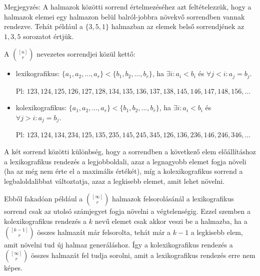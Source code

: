 


Megjegyzés: A halmazok közötti sorrend értelmezéséhez azt feltételezzük, hogy a halmazok elemei egy halmazon belül balról-jobbra növekvő sorrendben vannak rendezve. Tehát például a $\{3, 5, 1\}$ halmazban az elemek belső sorrendjének az $1, 3, 5$ sorozatot értjük.

\vspace{1em}

\noindent A $\binom{[n]}{r}$ nevezetes sorrendjei közül kettő:
\begin{itemize}
  \item lexikografikus:\hphantom{ko} $\{a_1, a_2, ..., a_r\} < \{b_1, b_2, ..., b_r\}$, ha $\exists i: a_i < b_i$ és $\forall j < i: a_j = b_j$.

  Pl: $123, 124, 125, 126, 127, 128, 134, 135, 136, 137, 138, 145, 146, 147, 148, 156, \dots$

  \item kolexikografikus: $\{a_1, a_2, ..., a_r\} < \{b_1, b_2, ..., b_r\}$, ha $\exists i: a_i < b_i$ és $\forall j > i: a_j = b_j$.

  Pl: $123, 124, 134, 234, 125, 135, 235, 145, 245, 345, 126, 136, 236, 146, 246, 346, \dots$
\end{itemize}

A két sorrend közötti különbség, hogy a sorrendben a következő elem előállításhoz a lexikografikus rendezés a legjobboldali, azaz a legnagyobb elemet fogja növeli (ha az még nem érte el a maximális értékét), míg a kolexikografikus sorrend a legbaloldalibbat változtatja, azaz a legkisebb elemet, amit lehet növelni.

\medskip

Ebből fakadóan például a $\binom{[\infty]}{r}$ halmazok felsorolásánál a lexikografikus sorrend csak az utolsó számjegyet fogja növelni a végtelenségig. Ezzel szemben a kolexikografikus rendezés a $k$ nevű elemet csak akkor veszi be a halmazba, ha a $\binom{[k-1]}{r}$ összes halmazát már felsorolta, tehát már a $k-1$ a legkisebb elem, amit növelni tud új halmaz generáláshoz. Így a kolexikografikus rendezés a $\binom{[\infty]}{r}$ összes halmazát fel tudja sorolni, amit a lexikografikus rendezés erre nem képes.

